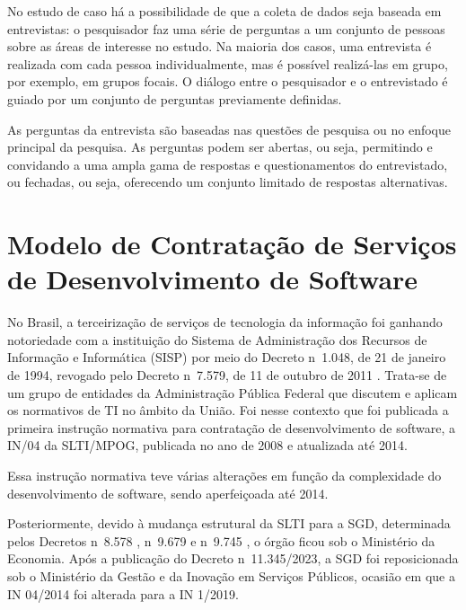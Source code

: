 No estudo de caso há a possibilidade de que a coleta de dados seja baseada em entrevistas: o pesquisador faz uma série de perguntas a um conjunto de pessoas sobre as áreas de interesse no estudo. Na maioria dos casos, uma entrevista é realizada com cada pessoa individualmente, mas é possível realizá-las em grupo, por exemplo, em grupos focais. O diálogo entre o pesquisador e o entrevistado é guiado por um conjunto de perguntas previamente definidas. \cite{wohlin2024experimentation}

As perguntas da entrevista são baseadas nas questões de pesquisa ou no enfoque principal da pesquisa. As perguntas podem ser abertas, ou seja, permitindo e convidando a uma ampla gama de respostas e questionamentos do entrevistado, ou fechadas, ou seja, oferecendo um conjunto limitado de respostas alternativas.



\section{Modelo de Contratação de Serviços de Desenvolvimento de Software}

No Brasil, a terceirização de serviços de tecnologia da informação foi ganhando notoriedade com a instituição do Sistema de Administração dos Recursos de Informação e Informática (SISP) por meio do Decreto n\textordmasculine\ 1.048, de 21 de janeiro de 1994, revogado pelo Decreto n\textordmasculine\ 7.579, de 11 de outubro de 2011 \cite{brasil2011decreto7579}. Trata-se de um grupo de entidades da Administração Pública Federal que discutem e aplicam os normativos de TI no âmbito da União. Foi nesse contexto que foi publicada a primeira instrução normativa para contratação de desenvolvimento de software, a IN/04 da SLTI/MPOG, publicada no ano de 2008 e atualizada até 2014.

Essa instrução normativa teve várias alterações em função da complexidade do desenvolvimento de software, sendo aperfeiçoada até 2014.

Posteriormente, devido à mudança estrutural da SLTI para a SGD, determinada pelos Decretos n\textordmasculine\ 8.578 \cite{brasil2015decreto8578}, n\textordmasculine\ 9.679 e n\textordmasculine\ 9.745 \cite{brasil2019decreto9679, brasil2019decreto9745}, o órgão ficou sob o Ministério da Economia. Após a publicação do Decreto n\textordmasculine\ 11.345/2023, a SGD foi reposicionada sob o Ministério da Gestão e da Inovação em Serviços Públicos, ocasião em que a IN 04/2014 foi alterada para a IN 1/2019.

